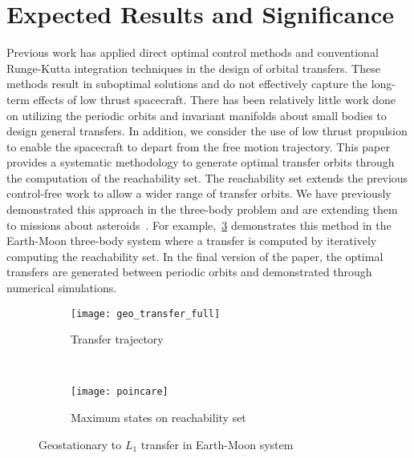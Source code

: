 \documentclass[letterpaper, preprint, paper,11pt]{AAS}	%
\begin{document}
\section{Expected Results and Significance}
Previous work has applied direct optimal control methods and conventional Runge-Kutta integration techniques in the design of orbital transfers. 
These methods result in suboptimal solutions and do not effectively capture the long-term effects of low thrust spacecraft. 
There has been relatively little work done on utilizing the periodic orbits and invariant manifolds about small bodies to design general transfers.
In addition, we consider the use of low thrust propulsion to enable the spacecraft to depart from the free motion trajectory. 
This paper provides a systematic methodology to generate optimal transfer orbits through the computation of the reachability set. 
The reachability set extends the previous control-free work to allow a wider range of transfer orbits. 
We have previously demonstrated this approach in the three-body problem and are extending them to missions about asteroids~\cite{kulumani2015}.
For example,~\cref{fig:geo_transfer} demonstrates this method in the Earth-Moon three-body system where a transfer is computed by iteratively computing the reachability set.
In the final version of the paper, the optimal transfers are generated between periodic orbits and demonstrated through numerical simulations.
\begin{figure} 
	\centering 
	\begin{subfigure}[htbp]{0.5\textwidth} 
		\texttt{[image: geo\_transfer\_full]} 
		\caption{Transfer trajectory} \label{fig:gull} 
	\end{subfigure}~ %
	\begin{subfigure}[htbp]{0.5\textwidth} 
		\texttt{[image: poincare]} 
		\caption{Maximum states on reachability set} \label{fig:tiger} 
	\end{subfigure} 
	\caption{Geostationary to \(L_1 \) transfer in Earth-Moon system}
	\label{fig:geo_transfer} 
\end{figure}




\end{document}
